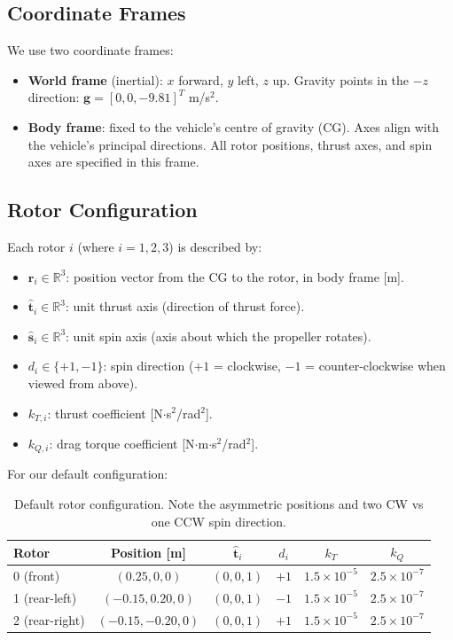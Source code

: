 \documentclass[12pt, a4paper]{article}
\newcommand{\R}{\mathbb{R}}
\begin{document}
\subsection{Coordinate Frames}

We use two coordinate frames:
\begin{itemize}
    \item \textbf{World frame} (inertial): $x$ forward, $y$ left, $z$ up.  Gravity points in the $-z$ direction: $\bm{g} = [0, 0, -9.81]^T$ m/s$^2$.
    \item \textbf{Body frame}: fixed to the vehicle's centre of gravity (CG).  Axes align with the vehicle's principal directions.  All rotor positions, thrust axes, and spin axes are specified in this frame.
\end{itemize}

\subsection{Rotor Configuration}

Each rotor $i$ (where $i = 1, 2, 3$) is described by:
\begin{itemize}
    \item $\bm{r}_i \in \R^3$: position vector from the CG to the rotor, in body frame [m].
    \item $\hat{\bm{t}}_i \in \R^3$: unit thrust axis (direction of thrust force).
    \item $\hat{\bm{s}}_i \in \R^3$: unit spin axis (axis about which the propeller rotates).
    \item $d_i \in \{+1, -1\}$: spin direction ($+1$ = clockwise, $-1$ = counter-clockwise when viewed from above).
    \item $k_{T,i}$: thrust coefficient [N$\cdot$s$^2$/rad$^2$].
    \item $k_{Q,i}$: drag torque coefficient [N$\cdot$m$\cdot$s$^2$/rad$^2$].
\end{itemize}

For our default configuration:
\begin{table}[H]
\centering
\begin{tabular}{lccccc}
\toprule
\textbf{Rotor} & \textbf{Position} [m] & $\hat{\bm{t}}_i$ & $d_i$ & $k_T$ & $k_Q$ \\
\midrule
0 (front)       & $(0.25, 0, 0)$       & $(0,0,1)$ & $+1$ & $1.5\times10^{-5}$ & $2.5\times10^{-7}$ \\
1 (rear-left)   & $(-0.15, 0.20, 0)$   & $(0,0,1)$ & $-1$ & $1.5\times10^{-5}$ & $2.5\times10^{-7}$ \\
2 (rear-right)  & $(-0.15, -0.20, 0)$  & $(0,0,1)$ & $+1$ & $1.5\times10^{-5}$ & $2.5\times10^{-7}$ \\
\bottomrule
\end{tabular}
\caption{Default rotor configuration.  Note the asymmetric positions and two CW vs one CCW spin direction.}
\label{tab:rotors}
\end{table}
\end{document}
